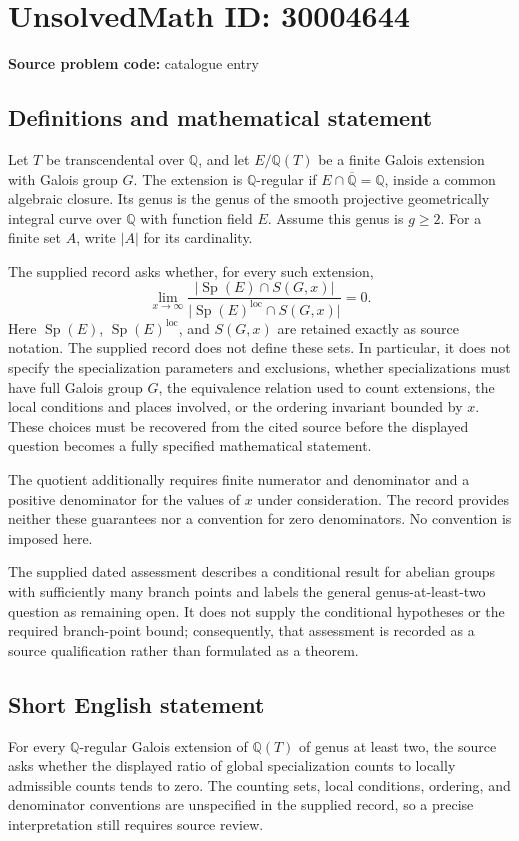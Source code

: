 \documentclass[11pt]{article}
\newcommand{\Q}{\mathbb{Q}}
\begin{document}
\section*{UnsolvedMath ID: 30004644}
\textbf{Source problem code:} catalogue entry
\subsection{Definitions and mathematical statement}
Let \(T\) be transcendental over \(\Q\), and let \(E/\Q(T)\) be a finite Galois extension with Galois group \(G\). The extension is \(\Q\)-regular if \(E\cap\overline{\Q}=\Q\), inside a common algebraic closure. Its genus is the genus of the smooth projective geometrically integral curve over \(\Q\) with function field \(E\). Assume this genus is \(g\geq 2\). For a finite set \(A\), write \(|A|\) for its cardinality.

The supplied record asks whether, for every such extension,
\[
\lim_{x\to\infty}
\frac{\bigl|\operatorname{Sp}(E)\cap S(G,x)\bigr|}
{\bigl|\operatorname{Sp}(E)^{\mathrm{loc}}\cap S(G,x)\bigr|}
=0.
\]
Here \(\operatorname{Sp}(E)\), \(\operatorname{Sp}(E)^{\mathrm{loc}}\), and \(S(G,x)\) are retained exactly as source notation. The supplied record does not define these sets. In particular, it does not specify the specialization parameters and exclusions, whether specializations must have full Galois group \(G\), the equivalence relation used to count extensions, the local conditions and places involved, or the ordering invariant bounded by \(x\). These choices must be recovered from the cited source before the displayed question becomes a fully specified mathematical statement.

The quotient additionally requires finite numerator and denominator and a positive denominator for the values of \(x\) under consideration. The record provides neither these guarantees nor a convention for zero denominators. No convention is imposed here.

The supplied dated assessment describes a conditional result for abelian groups with sufficiently many branch points and labels the general genus-at-least-two question as remaining open. It does not supply the conditional hypotheses or the required branch-point bound; consequently, that assessment is recorded as a source qualification rather than formulated as a theorem.
\subsection{Short English statement}
For every \(\Q\)-regular Galois extension of \(\Q(T)\) of genus at least two, the source asks whether the displayed ratio of global specialization counts to locally admissible counts tends to zero. The counting sets, local conditions, ordering, and denominator conventions are unspecified in the supplied record, so a precise interpretation still requires source review.
\end{document}

